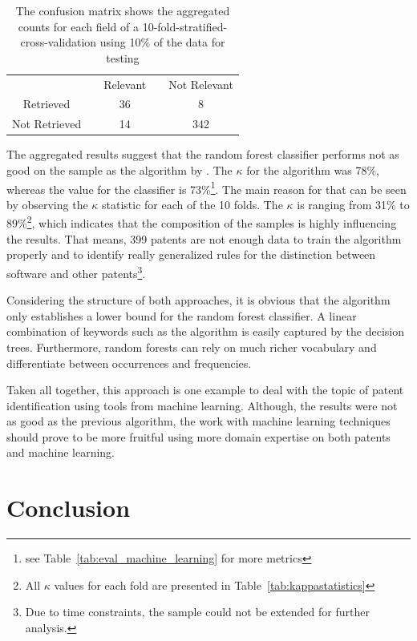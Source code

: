 \documentclass[12pt, a4paper, abstract, parskip]{scrartcl}
\newcommand{\ra}[1]{\renewcommand{\arraystretch}{#1}}
\theoremstyle{definition}
\begin{document}
\begin{table}[tb]\caption{The confusion matrix shows the aggregated counts for
each field of a 10-fold-stratified-cross-validation using 10\% of the data for
testing}\label{tab:confusion_ml_results}\centering\ra{1.3}
\begin{tabular}{@{}cp{0.5cm}cp{0.5cm}c@{}} \toprule
 & & Relevant & & Not Relevant\\ \cline{1-1} \cline{3-3} \cline{5-5}
Retrieved & & 36 & & 8\\
Not Retrieved & & 14 & & 342\\
\bottomrule
\end{tabular}
\end{table}

The aggregated results suggest that the random forest classifier performs not
as good on the sample as the algorithm by \citet{bessen2007empirical}. The
$\kappa$ for the algorithm was 78\%, whereas the value for the classifier is
73\%\footnote{see Table~\ref{tab:eval_machine_learning} for more metrics}. The
main reason for that can be seen by observing the $\kappa$ statistic for each
of the 10 folds. The $\kappa$ is ranging from 31\% to 89\%\footnote{All
$\kappa$ values for each fold are presented in
Table~\ref{tab:kappastatistics}}, which indicates that the composition of the
samples is highly influencing the results. That means, 399 patents are not
enough data to train the algorithm properly and to identify really generalized
rules for the distinction between software and other patents\footnote{Due to
time constraints, the sample could not be extended for further analysis.}.

Considering the structure of both approaches, it is obvious that the algorithm
only establishes a lower bound for the random forest classifier. A linear
combination of keywords such as the algorithm is easily captured by the
decision trees. Furthermore, random forests can rely on much richer vocabulary
and differentiate between occurrences and frequencies.

Taken all together, this approach is one example to deal with the topic of
patent identification using tools from machine learning. Although, the results
were not as good as the previous algorithm, the work with machine learning
techniques should prove to be more fruitful using more domain expertise on both
patents and machine learning.


\section{Conclusion} %
\label{sec:results}
\end{document}
